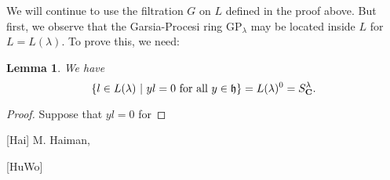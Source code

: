 \documentclass[12pt, reqno]{amsart}
\numberwithin{equation}{section}
\theoremstyle{definition}
\theoremstyle{plain}
\newtheorem{lemma}[theorem]{Lemma}
\newcommand{\CC}{\mathbf{C}}
\newcommand{\hh}{\mathfrak{h}}
\begin{document}
We will continue to use the filtration $G$ on $L$ defined in the proof above. But first, we observe that the Garsia-Procesi ring $\mathrm{GP}_\lambda$ may be located inside $L$ for $L=L(\lambda)$. To prove this, we need:
\begin{lemma}
We have
$$\{l \in L(\lambda) \ | \ yl=0 \ \hbox{for all $y \in \hh$} \}=L(\lambda)^0=S^\lambda_\CC.$$	
\end{lemma}
\begin{proof}
Suppose that $y l=0$ for 	
\end{proof}



%
\def\cprime{$'$} \def\cprime{$'$}
\begin{thebibliography}{GGOR}

[Hai]
 M. Haiman, \emph{}
 
 [HuWo] 
 
 \end{thebibliography}
\end{document}
